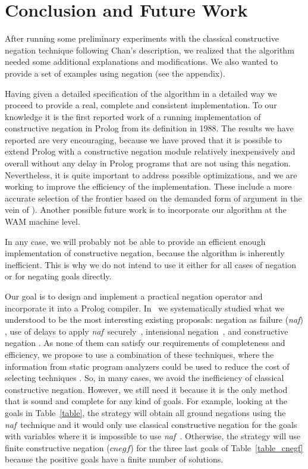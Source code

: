\documentclass{tlp}
\newcommand{\naf}{{\em naf}}\newcommand{\viejo}[1]{}
\begin{document}
\section{Conclusion and Future Work}
\label{conclusion}
After running some preliminary experiments with the classical constructive 
negation technique  following Chan's description, we realized that the
algorithm needed some additional explanations and modifications. We also
wanted to provide a set of examples using negation (see the appendix).

Having given a detailed specification of the algorithm in a detailed way
we proceed to provide a real, complete and consistent
implementation. To our knowledge it is the first reported work of a running
implementation
of constructive negation in Prolog from its definition in 1988. 
The results we have reported are very encouraging,
because we have proved that it is possible to extend Prolog with a
constructive negation module relatively inexpensively and overall
without any delay in Prolog programs that are not using this
negation. Nevertheless, it is quite important to address possible
optimizations, and we are working to improve the efficiency of the
implementation. These include a more accurate selection of the
frontier based on the demanded form of argument in the vein of
\cite{Moreno2}). 
Another possible future work is to incorporate our algorithm
at the WAM machine level.

In any case, we will probably not be able to provide an efficient enough
implementation of constructive negation, because the algorithm is
inherently inefficient.  This is why we do not intend to
use it either for all cases of negation or for negating goals
directly.

Our goal is to design and implement a practical negation operator and
incorporate it into a Prolog compiler.
In~\cite{SusanaPADL2000,SusanaLPAR01} we systematically studied what
we understood to be the most interesting existing proposals: negation
as failure (\naf) \cite{Clark}, use of delays to apply \naf\
securely~\cite{naish:lncs}, intensional
negation~\cite{Barbuti1,Barbuti2}, and constructive negation
\cite{Chan1,Chan2,Drabent,Stuckey,Stuckey95}. As none of them can
satisfy our requirements of completeness and efficiency, we propose to
use a combination of these techniques, where the information from
static program analyzers could be used to reduce the cost of selecting
techniques \cite{SusanaLPAR01}. So, in many cases, we avoid the
inefficiency of classical constructive negation. However, we still
need it because it is the only method that is sound and complete for
any kind of goals. For example, looking at the goals in
Table~\ref{table}, the strategy will obtain all ground negations using
the \naf\ technique and it would only use classical constructive
negation for the goals with variables where it is impossible to use
\naf\ . Otherwise, the strategy will use finite constructive negation
($cnegf$) for the three last goals of Table~\ref{table_cnegf} because
the positive goals have a finite number of solutions.
\end{document}
